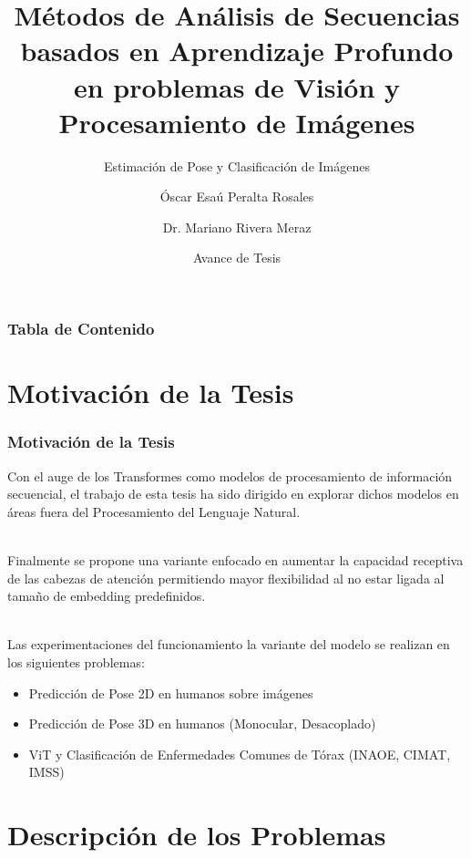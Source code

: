 \documentclass{beamer}
\title[Avance de Tesis] %
{Métodos de Análisis de Secuencias basados en Aprendizaje Profundo en problemas de Visión y Procesamiento de Imágenes}
\subtitle{Estimación de Pose y Clasificación de Imágenes}
\author[Esaú Peralta] %
{Óscar Esaú Peralta Rosales\inst{1} \and Dr. Mariano Rivera Meraz\inst{1}}
\institute[CIMAT] %
{
  \inst{1}%
  Centro de Investigación en Matemáticas A.C.
}
\date[Julio 2021] %
{Avance de Tesis}
\begin{document}
\frame{\titlepage}


\begin{frame}
\frametitle{Tabla de Contenido}
\tableofcontents
\end{frame}


\section{Motivación de la Tesis}


\begin{frame}
\frametitle{Motivación de la Tesis}
Con el auge de los Transformes como modelos de procesamiento de información secuencial, el trabajo
de esta tesis ha sido dirigido en explorar dichos modelos en áreas fuera del Procesamiento del
Lenguaje Natural.\\~\

Finalmente se propone una variante enfocado en aumentar la capacidad receptiva de las cabezas de
atención permitiendo mayor flexibilidad al no estar ligada al tamaño de embedding predefinidos.\\~\

Las experimentaciones del funcionamiento la variante del modelo se realizan en los siguientes
problemas:
\begin{itemize}
    \item Predicción de Pose 2D en humanos sobre imágenes
    \item Predicción de Pose 3D en humanos (Monocular, Desacoplado)
    \item ViT y Clasificación de Enfermedades Comunes de Tórax (INAOE, CIMAT, IMSS)
\end{itemize}
\end{frame}


\section{Descripción de los Problemas}
\end{document}
